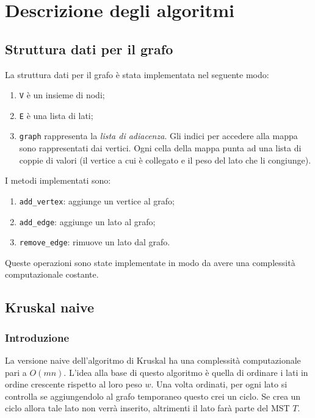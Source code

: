 \section{Descrizione degli algoritmi}

\subsection{Struttura dati per il grafo}

La struttura dati per il grafo è stata implementata nel seguente
modo:
\begin{enumerate}
    \item \verb|V| è un insieme di nodi;
    \item \verb|E| è una lista di lati;
    \item \verb|graph| rappresenta la \textit{lista di adiacenza}.
    Gli indici per accedere alla mappa sono rappresentati dai vertici.
    Ogni cella della mappa punta ad una lista di coppie di valori
    (il vertice a cui è collegato e il peso del lato che li
    congiunge).
\end{enumerate}

\noindent I metodi implementati sono:
\begin{enumerate}
    \item \verb|add_vertex|: aggiunge un vertice al grafo;
    \item \verb|add_edge|: aggiunge un lato al grafo;
    \item \verb|remove_edge|: rimuove un lato dal grafo.
\end{enumerate}
Queste operazioni sono state implementate in modo da avere una
complessità computazionale costante.

\subsection{Kruskal naive}

\subsubsection{Introduzione}

La versione naive dell'algoritmo di Kruskal ha una complessità
computazionale pari a $O(mn)$. L'idea alla base di questo
algoritmo è quella di ordinare i lati in ordine crescente rispetto al
loro peso $w$. Una volta ordinati, per ogni lato si controlla se
aggiungendolo al grafo temporaneo questo crei un ciclo. Se crea un
ciclo allora tale lato non verrà inserito, altrimenti il lato farà
parte del MST $T$.


